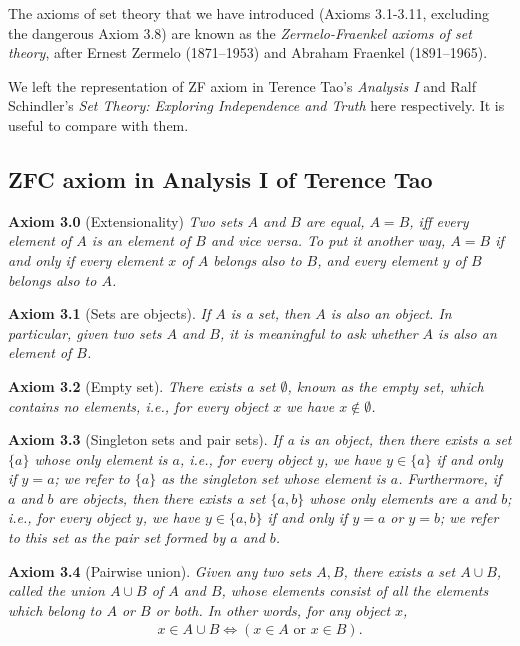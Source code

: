 \documentclass{book}
\newcommand{\titl}[1]{\noindent\textbf{#1}}
\begin{document}
The axioms of set theory that we have introduced (Axioms 3.1-3.11, excluding the dangerous Axiom 3.8) are known as the \emph{Zermelo-Fraenkel axioms of set theory}, after Ernest Zermelo (1871–1953) and Abraham Fraenkel (1891–1965).

We left the representation of ZF axiom in Terence Tao's \emph{Analysis I} and Ralf Schindler's \emph{Set Theory: Exploring Independence and Truth} here respectively. It is useful to compare with them.

\subsection{ZFC axiom in Analysis I of Terence Tao}
\begin{framed}
\titl{Axiom 3.0} (Extensionality) \emph{Two sets $A$ and $B$ are equal, $A=B$, iff every element of $A$ is an element of $B$ and vice versa. To put it another way, $A=B$ if and only if every element $x$ of $A$ belongs also to $B$, and every element $y$ of $B$ belongs also to $A$.}
\end{framed}

\begin{framed}
\titl{Axiom 3.1} (Sets are objects). \emph{If $A$ is a set, then $A$ is also an object. In particular, given two sets $A$ and $B$, it is meaningful to ask whether $A$ is also an element of $B$.}
\end{framed}

\begin{framed}
\titl{Axiom 3.2} (Empty set). \emph{There exists a set $\emptyset$, known as the empty set, which contains no elements, i.e., for every object $x$ we have $x\notin\emptyset$.}
\end{framed}

\begin{framed}
\titl{Axiom 3.3} (Singleton sets and pair sets). \emph{If a is an object, then there exists a set $\{a\}$ whose only element is $a$, i.e., for every object $y$, we have $y\in\{a\}$ if and only if $y=a$; we refer to $\{a\}$ as the singleton set whose element is $a$. Furthermore, if $a$ and $b$ are objects, then there exists a set $\{a,b\}$ whose only elements are a and $b$; i.e., for every object $y$, we have $y\in\{a,b\}$ if and only if $y=a$ or $y=b$; we refer to this set as the pair set formed by $a$ and $b$.}
\end{framed}

\begin{framed}
\titl{Axiom 3.4} (Pairwise union). \emph{Given any two sets $A,B$, there exists a set $A\cup B$, called the union $A\cup B$ of $A$ and $B$, whose elements consist of all the elements which belong to $A$ or $B$ or both. In other words, for any object $x$,}
\begin{align*}
   x\in A\cup B\iff(x\in A\text{ or }x\in B).
\end{align*}
\end{framed}
\end{document}
